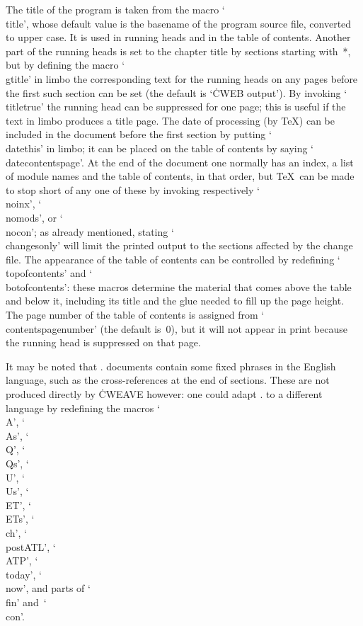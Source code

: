 The title of the program is taken from the macro `\.{\\title}', whose
default value is the basename of the program source file, converted to upper
case. It is used in running heads and in the table of contents. Another part
of the running heads is set to the chapter title by sections starting
with~\:*, but by defining the macro `\.{\\gtitle}' in limbo the
corresponding text for the running heads on any pages before the first such
section can be set (the default is `\.{CWEB} output'). By invoking
`\.{\\titletrue}' the running head can be suppressed for one page; this is
useful if the text in limbo produces a title page.  The date of processing
(by \TeX) can be included in the document before the first section by
putting `\.{\\datethis}' in limbo; it can be placed on the table of contents
by saying `\.{\\datecontentspage}'. At the end of the document one normally
has an index, a list of module names and the table of contents, in that
order, but \TeX\ can be made to stop short of any one of these by invoking
respectively `\.{\\noinx}', `\.{\\nomods}', or `\.{\\nocon}'; as already
mentioned, stating `\.{\\changesonly}' will limit the printed output to the
sections affected by the change file. The appearance of the table of
contents can be controlled by redefining `\.{\\topofcontents}' and
`\.{\\botofcontents}': these macros determine the material that comes above
the table and below it, including its title and the glue needed to fill up
the page height. The page number of the table of contents is assigned from
`\.{\\contentspagenumber}' (the default is~0), but it will not appear in
print because the running head is suppressed on that page.

It may be noted that \CWEB. documents contain some fixed phrases in the
English language, such as the cross-references at the end of sections. These
are not produced directly by \.{CWEAVE} however: one could adapt \CWEB. to a
different language by redefining the macros `\.{\\A}', `\.{\\As}', `\.{\\Q}',
`\.{\\Qs}', `\.{\\U}', `\.{\\Us}', `\.{\\ET}', `\.{\\ETs}', `\.{\\ch}',
`\.{\\postATL}', `\.{\\ATP}', `\.{\\today}', `\.{\\now}', and parts of
`\.{\\fin}' and~`\.{\\con}'.


